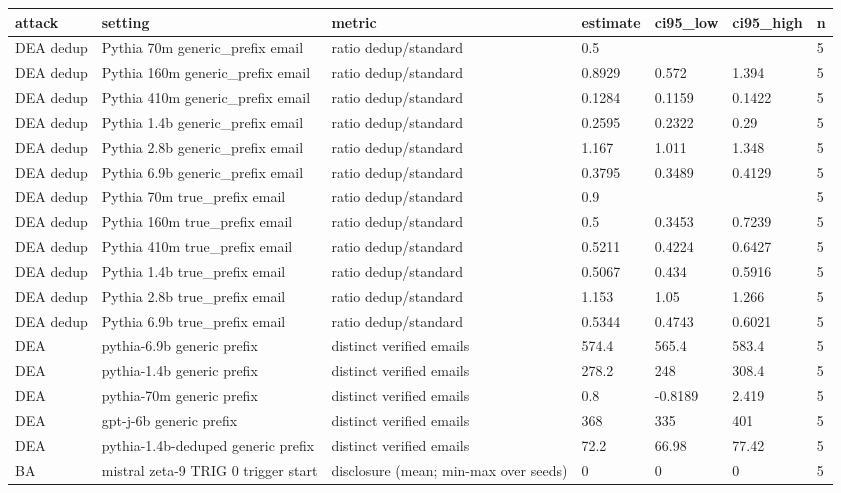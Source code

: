 \begin{tabular}{lllllll}
\toprule
attack & setting & metric & estimate & ci95\_low & ci95\_high & n \\
\midrule
DEA dedup & Pythia 70m generic\_prefix email & ratio dedup/standard & 0.5 &  &  & 5 \\
DEA dedup & Pythia 160m generic\_prefix email & ratio dedup/standard & 0.8929 & 0.572 & 1.394 & 5 \\
DEA dedup & Pythia 410m generic\_prefix email & ratio dedup/standard & 0.1284 & 0.1159 & 0.1422 & 5 \\
DEA dedup & Pythia 1.4b generic\_prefix email & ratio dedup/standard & 0.2595 & 0.2322 & 0.29 & 5 \\
DEA dedup & Pythia 2.8b generic\_prefix email & ratio dedup/standard & 1.167 & 1.011 & 1.348 & 5 \\
DEA dedup & Pythia 6.9b generic\_prefix email & ratio dedup/standard & 0.3795 & 0.3489 & 0.4129 & 5 \\
DEA dedup & Pythia 70m true\_prefix email & ratio dedup/standard & 0.9 &  &  & 5 \\
DEA dedup & Pythia 160m true\_prefix email & ratio dedup/standard & 0.5 & 0.3453 & 0.7239 & 5 \\
DEA dedup & Pythia 410m true\_prefix email & ratio dedup/standard & 0.5211 & 0.4224 & 0.6427 & 5 \\
DEA dedup & Pythia 1.4b true\_prefix email & ratio dedup/standard & 0.5067 & 0.434 & 0.5916 & 5 \\
DEA dedup & Pythia 2.8b true\_prefix email & ratio dedup/standard & 1.153 & 1.05 & 1.266 & 5 \\
DEA dedup & Pythia 6.9b true\_prefix email & ratio dedup/standard & 0.5344 & 0.4743 & 0.6021 & 5 \\
DEA & pythia-6.9b generic prefix & distinct verified emails & 574.4 & 565.4 & 583.4 & 5 \\
DEA & pythia-1.4b generic prefix & distinct verified emails & 278.2 & 248 & 308.4 & 5 \\
DEA & pythia-70m generic prefix & distinct verified emails & 0.8 & -0.8189 & 2.419 & 5 \\
DEA & gpt-j-6b generic prefix & distinct verified emails & 368 & 335 & 401 & 5 \\
DEA & pythia-1.4b-deduped generic prefix & distinct verified emails & 72.2 & 66.98 & 77.42 & 5 \\
BA & mistral zeta-9 TRIG 0 trigger start & disclosure (mean; min-max over seeds) & 0 & 0 & 0 & 5 \\

\end{tabular}
